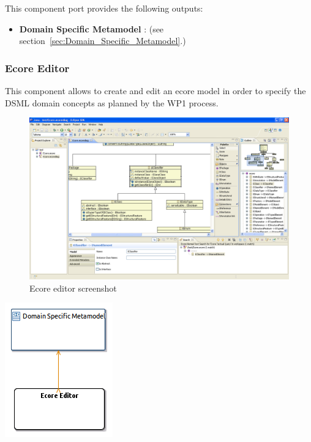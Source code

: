 \documentclass{gemoc} %
\begin{document}
This component port provides the following outputs:
\begin{itemize}
  \item \textbf{Domain Specific Metamodel} :
(see section~\ref{sec:Domain_Specific_Metamodel}.)
\end{itemize}

\subsubsection{Ecore Editor}
\label{sec:Ecore_Editor}

This component allows to create and edit an ecore model in order to specify the DSML domain concepts as planned by the WP1 process.
\begin{figure}[h]
	\begin{center}
	\includegraphics*[trim=0.0cm 0.0cm 0cm 0.0cm, clip=true, width=1.0\linewidth]{../images/EcoreDiagramOverview.png}
	\caption{Ecore editor screenshot}
	\end{center}
\end{figure}
\begin{center}
\includegraphics*[trim=0.0cm 0.0cm 0cm 0.0cm, clip=true]{../images/generated/Generated_Ecore_Editor.png}
\end{center}
\end{document}
